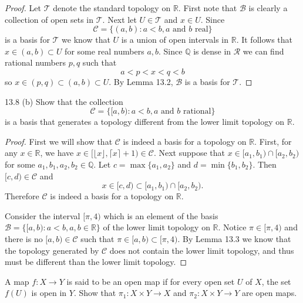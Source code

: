 \documentclass[11pt]{article}
\begin{document}
\begin{proof}
  Let $\mathcal{T}$ denote the standard topology on $\mathbb{R}$. First note
  that $\mathcal{B}$ is clearly a collection of open sets in $\mathcal{T}$.
  Next let $U \in \mathcal{T}$ and $x \in U$. Since
  \[ \mathcal{C} = \{ (a, b): a < b, a \text{ and } b \text{ real} \} \]
  is a basis for $\mathcal{T}$ we know that $U$ is a union of open intervals in
  $\mathbb{R}$. It follows that $x \in (a, b) \subset U$ for some real numbers
  $a, b$. Since $\mathbb{Q}$ is dense in $\mathcal{R}$ we can find rational
  numbers $p, q$ such that
  \[ a < p < x < q < b \]
  so $x \in (p, q) \subset (a, b) \subset U$. By Lemma 13.2, $\mathcal{B}$ is a basis for
  $\mathcal{T}$.
\end{proof}

\begin{ex}{13.8 (b)}
  Show that the collection
  \[\mathcal{C} = \{[a,b) : a < b, a \text{ and } b \text{ rational}\} \]
  is a basis that generates a topology different from the lower limit topology on $\mathbb{R}$.
\end{ex}

\begin{proof}
  First we will show that $\mathcal{C}$ is indeed a basis for a topology on
  $\mathbb{R}$. First, for any $x \in \mathbb{R}$, we have $x \in \big[\lfloor x
  \rfloor, \lceil x \rceil + 1\big) \in \mathcal{C}.$ Next suppose that $x \in
  [a_1, b_1) \cap [a_2, b_2)$ for some $a_1,b_1,a_2,b_2 \in \mathbb{Q}$.
  Let $c = \max\{a_1, a_2\}$ and $d = \min\{b_1, b_2\}$. Then $[c, d) \in
  \mathcal{C}$ and
  \[ x \in [c, d) \subset [a_1, b_1) \cap [a_2, b_2). \]
  Therefore $\mathcal{C}$ is indeed a basis for a topology on $\mathbb{R}$.

  Consider the interval $[\pi, 4)$ which is an element of the basis
  $\mathcal{B} = \{[a,b) : a < b, a,b \in \mathbb{R}\}$
  of the lower limit topology on $\mathbb{R}$. Notice $\pi \in [\pi,
  4)$ and there is no $[a, b) \in \mathcal{C}$ such that $\pi \in [a, b) \subset
  [\pi, 4)$. By Lemma 13.3 we know that the topology generated by $\mathcal{C}$
  does not contain the lower limit topology, and thus must be different than the
  lower limit topology.
\end{proof}

\begin{ex}{16.4}
  A map $f: X \to Y$ is said to be an open map if for every open set $U$ of $X$,
  the set $f(U)$ is open in $Y$. Show that $\pi_1: X \times Y \to X$ and $\pi_2:
  X\times Y \to Y$ are open maps.
\end{ex}
\end{document}
